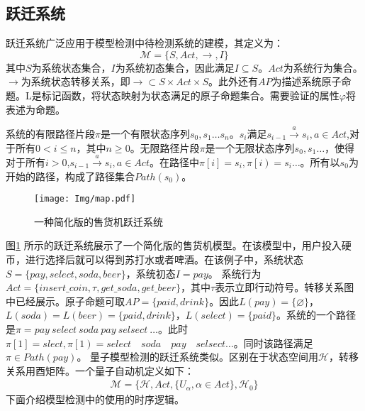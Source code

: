 \subsection{跃迁系统}
跃迁系统广泛应用于模型检测中待检测系统的建模，其定义为\citep{baier2008principles}：
\begin{equation}
\mathcal{M}=\{S,Act,\rightarrow,I\}
\end{equation}
其中\(S\)为系统状态集合，\(I\)为系统初态集合，因此满足\(I\subseteq S\)。\(Act\)为系统行为集合。\(\rightarrow\)为系统状态转移关系，即\(\rightarrow\subset S\times Act\times S\)。此外还有\(AP\)为描述系统原子命题。L是标记函数，将状态映射为状态满足的原子命题集合。需要验证的属性\(\varphi\)将表述为命题。


系统的有限路径片段\(\pi\)是一个有限状态序列\(s_0,s_1\ldots s_n\)。\(s_i\)满足\(s_{i-1}\overset{a}{\rightarrow}s_i,a\in Act\),对于所有\(0<i\leq n\)，其中\(n\geq 0 \)。无限路径片段\(\pi\)是一个无限状态序列\(s_0,s_1\ldots\)，使得对于所有\(i>0\),\(s_{i-1} \overset{a}{\rightarrow}  s_i,a\in Act\)。在路径中\(\pi\left[i\right]=s_i,\pi\left[i\right)=s_i\ldots\)。所有以\(s_0\)为开始的路径，构成了路径集合\(Path\left(s_0\right)\)。

\begin{figure}[!htbp]
    \centering
    \texttt{[image: Img/map.pdf]}
    \caption{一种简化版的售货机跃迁系统}
    \label{fig:transition-system}
\end{figure}

图\ref{fig:transition-system} 所示的跃迁系统展示了一个简化版的售货机模型。在该模型中，用户投入硬币，进行选择后就可以得到苏打水或者啤酒。在该例子中，系统状态\(S=\{pay,select,soda,beer\}\)，系统初态\(I=pay\)。
系统行为\(Act=\{insert\_coin,\tau,get\_soda,get\_beer\}\)，其中\(\tau\)表示立即行动符号。转移关系图中已经展示。原子命题可取\(AP=\{paid,drink\}\)。因此\(L\left( pay \right)=\{\varnothing\}\)，\(L\left(soda\right)=L\left(beer\right)=\{paid,drink\}\)，\(L\left(select\right)=\{paid\}\)。系统的一个路径是\(\pi=pay\ select\ soda\ pay\ selsect\ \ldots\)。此时\(\pi\left[1\right]=slect,\pi\left[1\right)=select\quad soda\quad pay\quad selsect\ldots\)。同时该路径满足\(\pi\in Path\left(pay\right)\)。
量子模型检测的跃迁系统类似。区别在于状态空间用\(\mathcal{H}\)，转移关系用酉矩阵。一个量子自动机定义如下：
\begin{align}
    \mathcal{M}=\{\mathcal{H},Act,\{U_\alpha,\alpha\in Act\},\mathcal{H}_0\}
\end{align}
下面介绍模型检测中的使用的时序逻辑。

